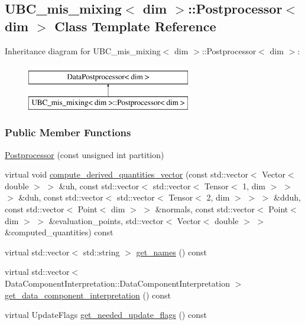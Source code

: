 \hypertarget{class_u_b_c__mis__mixing_1_1_postprocessor}{}\subsection{U\+B\+C\+\_\+mis\+\_\+mixing$<$ dim $>$\+:\+:Postprocessor$<$ dim $>$ Class Template Reference}
\label{class_u_b_c__mis__mixing_1_1_postprocessor}
Inheritance diagram for U\+B\+C\+\_\+mis\+\_\+mixing$<$ dim $>$\+:\+:Postprocessor$<$ dim $>$\+:\begin{figure}[H]
\begin{center}
\leavevmode
\includegraphics[height=2.000000cm]{class_u_b_c__mis__mixing_1_1_postprocessor}
\end{center}
\end{figure}
\subsubsection*{Public Member Functions}
\begin{DoxyCompactItemize}
\item 
\hyperlink{class_u_b_c__mis__mixing_1_1_postprocessor_ac74c98c423a4fe0dba8f9ef9279c0607}{Postprocessor} (const unsigned int partition)
\item 
virtual void \hyperlink{class_u_b_c__mis__mixing_1_1_postprocessor_ae5ca8f1ef4eb8c682f2c322e7d47b85c}{compute\+\_\+derived\+\_\+quantities\+\_\+vector} (const std\+::vector$<$ Vector$<$ double $>$ $>$ \&uh, const std\+::vector$<$ std\+::vector$<$ Tensor$<$ 1, dim $>$ $>$ $>$ \&duh, const std\+::vector$<$ std\+::vector$<$ Tensor$<$ 2, dim $>$ $>$ $>$ \&dduh, const std\+::vector$<$ Point$<$ dim $>$ $>$ \&normals, const std\+::vector$<$ Point$<$ dim $>$ $>$ \&evaluation\+\_\+points, std\+::vector$<$ Vector$<$ double $>$ $>$ \&computed\+\_\+quantities) const 
\item 
virtual std\+::vector$<$ std\+::string $>$ \hyperlink{class_u_b_c__mis__mixing_1_1_postprocessor_a05ee9a5d6d913c2fe41cb67f9f6f3893}{get\+\_\+names} () const 
\item 
virtual std\+::vector$<$ Data\+Component\+Interpretation\+::\+Data\+Component\+Interpretation $>$ \hyperlink{class_u_b_c__mis__mixing_1_1_postprocessor_a3038fa1744200de88fe27c335ded7a39}{get\+\_\+data\+\_\+component\+\_\+interpretation} () const 
\item 
virtual Update\+Flags \hyperlink{class_u_b_c__mis__mixing_1_1_postprocessor_a002ab5928ee9d405325b9804355ccb9c}{get\+\_\+needed\+\_\+update\+\_\+flags} () const 
\end{DoxyCompactItemize}


